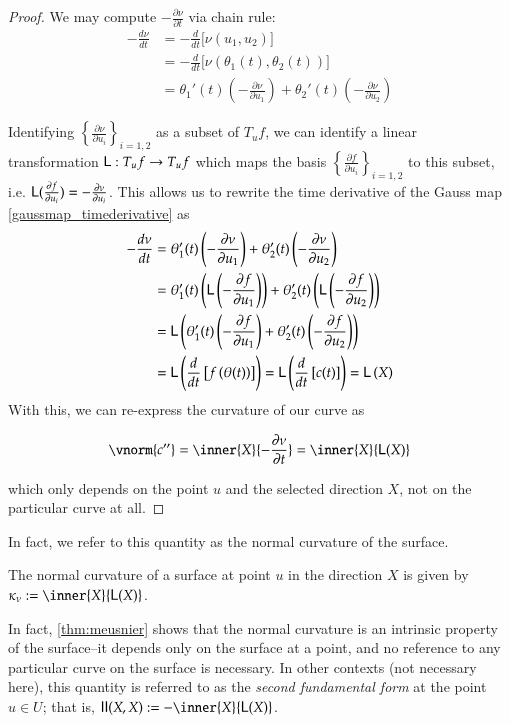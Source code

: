 \begin{proof}
	We may compute $-\frac{\partial \nu}{\partial t}$ via chain rule:
	\begin{align} \label{gaussmap_timederivative}
	-\frac{d \nu}{dt} &= -\frac{d}{dt}\big[\nu(u_1, u_2)\big] \\
	&= -\frac{d}{dt}\big[\nu(\theta_1(t), \theta_2(t))\big] \\
	&= \theta_1'(t)\left( - \frac{\partial \nu}{\partial u_1} \right) + 
	\theta_2'(t)\left( - \frac{\partial \nu}{\partial u_2} \right)
	\end{align}
	
	
	Identifying $\left\{ \frac{\partial \nu}{\partial u_i}\right\}_{i=1,2}$ as a subset of $T_u f$,  we can identify a linear transformation $\mathsf{L}: T_u f \to T_u f$ which maps the basis
	$\left\{ \frac{\partial f}{\partial u_i}\right\}_{i=1,2}$ to this subset, i.e.
	$\mathsf{L}(\frac{\partial f}{\partial u_i}) = - \frac{\partial \nu}{\partial u_i}$. This allows us to rewrite the time derivative of the Gauss map \cref{gaussmap_timederivative} as
		\begin{align}
		-\frac{d \nu}{dt} &= 
		\theta_1'(t)\left( - \frac{\partial \nu}{\partial u_1} \right) + 
		\theta_2'(t)\left( - \frac{\partial \nu}{\partial u_2} \right) \\
		&= \theta_1'(t)\left( \mathsf{L}\left(- \frac{\partial f}{\partial u_1}\right) \right) + 
		\theta_2'(t)\left( \mathsf{L}\left(- \frac{\partial f}{\partial u_2}\right) \right) \\
		&= \mathsf{L}\left(\theta_1'(t)\left( - \frac{\partial f}{\partial u_1}\right)  + 
		\theta_2'(t)\left( - \frac{\partial f}{\partial u_2} \right)\right) \\
		&= \mathsf{L}\left( \frac{d}{dt}\left[ f\left(\theta(t)\right)\right] \right)
		= \mathsf{L}\left( \frac{d}{dt} \left[ c(t) \right] \right) = \mathsf{L}\left(X\right)
		\end{align} 
		With this, we can re-express the curvature of our curve as
		
		\begin{equation}
		\vnorm{c''} = \inner{X}{-\frac{\partial \nu}{\partial t}} = \inner{X}{\wein(X)}
		\end{equation}
		
		which only depends on the point $u$ and the selected direction $X$, not on the particular curve at all.
	\end{proof}
	In fact, we refer to this quantity as the normal curvature of the surface. 
	
	\begin{defn}
		The normal curvature of a surface at point $u$ in the direction $X$ is given by $\kappa_\nu :=  \inner{X}{\wein(X)}$.
	\end{defn}
	In fact, \cref{thm:meusnier} shows that the normal curvature is an intrinsic property of the surface--it depends only on the
	surface at a point, and no reference to any particular curve on the surface is necessary.
	In other contexts (not necessary here), this quantity is referred to as the \textit{second fundamental form} at the point $u \in U$; that is, $ \mathbf{II}(X,X) := - \inner{X}{\wein(X)}$.
	
